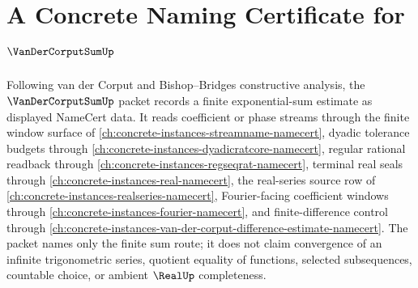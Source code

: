 \chapter{A Concrete Naming Certificate for $\VanDerCorputSumUp$}
\label{ch:concrete-instances-van-der-corput-sum-namecert}

Following van der Corput and Bishop--Bridges constructive analysis, the $\VanDerCorputSumUp$ packet records a finite exponential-sum estimate as displayed NameCert data. It reads coefficient or phase streams through the finite window surface of \autoref{ch:concrete-instances-streamname-namecert}, dyadic tolerance budgets through \autoref{ch:concrete-instances-dyadicratcore-namecert}, regular rational readback through \autoref{ch:concrete-instances-regseqrat-namecert}, terminal real seals through \autoref{ch:concrete-instances-real-namecert}, the real-series source row of \autoref{ch:concrete-instances-realseries-namecert}, Fourier-facing coefficient windows through \autoref{ch:concrete-instances-fourier-namecert}, and finite-difference control through \autoref{ch:concrete-instances-van-der-corput-difference-estimate-namecert}. The packet names only the finite sum route; it does not claim convergence of an infinite trigonometric series, quotient equality of functions, selected subsequences, countable choice, or ambient $\RealUp$ completeness.

